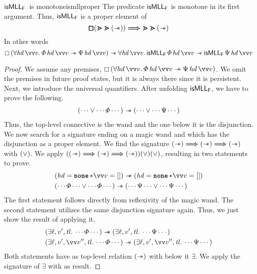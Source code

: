 \documentclass[thesis.tex]{subfiles}
\begin{document}
\begin{example}{$\textsf{\upshape isMLL}_{\textsf{\upshape F}}$\ is monotone}{ismllproper}
  The predicate $\textsf{\upshape isMLL}_{\textsf{\upshape F}}$ is monotone in its first argument. Thus, $\textsf{\upshape isMLL}_{\textsf{\upshape F}}$ is a proper element of
  \[
    \pmb{\mathop{\boxempty}} (\bm{\gtrdot} \bm{\gtrdot} (\mathrel{-\!\!\ast})) \mathrel{\bm{\Longrightarrow}} \bm{\gtrdot} \bm{\gtrdot} (\mathrel{-\!\!\ast})
  \]
  In other words
  \[
    \always{(\All \hd\, \vect{v}. \pred\, \hd\, \vect{v} \wand \predB\, \hd\, \vect{v})} \wand \All \hd\, \vect{v}. \isMLL_\hopred\, \pred\, \hd\, \vect{v} \wand \isMLL_\hopred\, \predB\, \hd\, \vect{v}
  \]


  \begin{proof}
    We assume any premises, $\always{(\All \hd\, \vect{v}. \pred\, \hd\, \vect{v} \wand \predB\, \hd\, \vect{v})}$. We omit the premises in future proof states, but it is always there since it is persistent. Next, we introduce the universal quantifiers. After unfolding $\textsf{\upshape isMLL}_{\textsf{\upshape F}}$, we have to prove the following.
    \begin{align*}
      (\cdots \lor \cdots \varPhi \cdots) \mathrel{-\!\!\ast} (\cdots \lor \cdots \Psi \cdots)
    \end{align*}
    Thus, the top-level connective is the wand and the one below it is the disjunction. We now search for a signature ending on a magic wand and which has the disjunction as a proper element. We find the signature ${(\mathrel{-\!\!\ast}) \mathrel{\bm{\Longrightarrow}} (\mathrel{-\!\!\ast}) \mathrel{\bm{\Longrightarrow}} (\mathrel{-\!\!\ast})}$ with $(\lor)$. We apply $((\mathrel{-\!\!\ast}) \mathrel{\bm{\Longrightarrow}} (\mathrel{-\!\!\ast}) \mathrel{\bm{\Longrightarrow}} (\mathrel{-\!\!\ast})) (\lor) (\lor)$, resulting in two statements to prove.
    \begin{align*}
       & (\hd = \None * \vect{\val} = []) \wand (\hd = \None * \vect{\val} = [])                                \\
       & (\cdots \pred \cdots \lor \cdots  \pred \cdots) \wand (\cdots \predB \cdots \lor \cdots \predB \cdots)
    \end{align*}
    The first statement follows directly from reflexivity of the magic wand. The second statement utilizes the same disjunction signature again. Thus, we just show the result of applying it.
    \begin{align*}
       & (\Exists \loc, \val', \tl. \cdots \pred \cdots) \wand (\Exists \loc, \val', \tl. \cdots \predB \cdots)                               \\
       & (\Exists \loc, \val', \vect{\val}'', \tl. \cdots \pred \cdots) \wand (\Exists \loc, \val', \vect{\val}'', \tl. \cdots \predB \cdots)
    \end{align*}
    Both statements have as top-level relation $(\mathrel{-\!\!\ast})$ with below it $\exists$. We apply the signature of $\exists$ with as result.

\end{proof}
\end{example}
\end{document}

